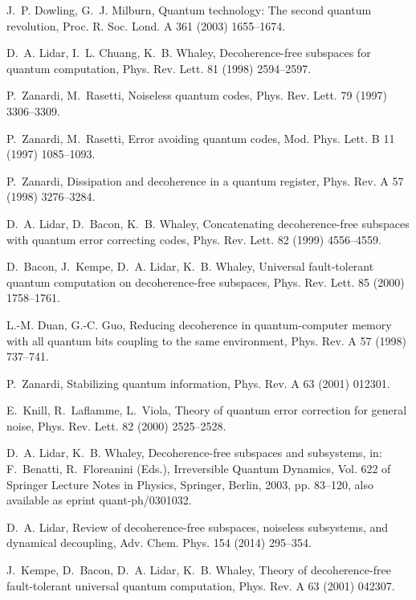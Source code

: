 \documentclass[3p,sort&compress]{elsarticle}
\begin{document}
\begin{thebibliography}{100}
J.~P. Dowling, G.~J. Milburn, Quantum technology: The second quantum
  revolution, Proc. R. Soc. Lond. A 361 (2003) 1655--1674.

D.~A. Lidar, I.~L. Chuang, K.~B. Whaley, Decoherence-free subspaces for quantum
  computation, Phys. Rev. Lett. 81 (1998) 2594--2597.

P.~Zanardi, M.~Rasetti, Noiseless quantum codes, Phys. Rev. Lett. 79 (1997)
  3306--3309.

P.~Zanardi, M.~Rasetti, Error avoiding quantum codes, Mod. Phys. Lett. B 11
  (1997) 1085--1093.

P.~Zanardi, Dissipation and decoherence in a quantum register, Phys. Rev. A 57
  (1998) 3276--3284.

D.~A. Lidar, D.~Bacon, K.~B. Whaley, Concatenating decoherence-free subspaces
  with quantum error correcting codes, Phys. Rev. Lett. 82 (1999) 4556--4559.

D.~Bacon, J.~Kempe, D.~A. Lidar, K.~B. Whaley, Universal fault-tolerant quantum
  computation on decoherence-free subspaces, Phys. Rev. Lett. 85 (2000)
  1758--1761.

L.-M. Duan, G.-C. Guo, Reducing decoherence in quantum-computer memory with all
  quantum bits coupling to the same environment, Phys. Rev. A 57 (1998)
  737--741.

P.~Zanardi, Stabilizing quantum information, Phys. Rev. A 63 (2001) 012301.

E.~Knill, R.~Laflamme, L.~Viola, Theory of quantum error correction for general
  noise, Phys. Rev. Lett. 82 (2000) 2525--2528.

D.~A. Lidar, K.~B. Whaley, Decoherence-free subspaces and subsystems, in:
  F.~Benatti, R.~Floreanini (Eds.), Irreversible Quantum Dynamics, Vol. 622 of
  Springer Lecture Notes in Physics, Springer, Berlin, 2003, pp. 83--120, also
  available as eprint quant-ph/0301032.

D.~A. Lidar, Review of decoherence-free subspaces, noiseless subsystems, and
  dynamical decoupling, Adv. Chem. Phys. 154 (2014) 295--354.

J.~Kempe, D.~Bacon, D.~A. Lidar, K.~B. Whaley, Theory of decoherence-free
  fault-tolerant universal quantum computation, Phys. Rev. A 63 (2001) 042307.


\end{thebibliography}
\end{document}
